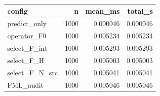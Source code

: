 \begin{tabular}{lrrr}
\toprule
config & n & mean\_ms & total\_s \\
\midrule
predict\_only & 1000 & 0.000046 & 0.000046 \\
operator\_F0 & 1000 & 0.005234 & 0.005234 \\
select\_F\_int & 1000 & 0.005293 & 0.005293 \\
select\_F\_H & 1000 & 0.005003 & 0.005003 \\
select\_F\_N\_src & 1000 & 0.005041 & 0.005041 \\
FML\_audit & 1000 & 0.005046 & 0.005046 \\
\bottomrule
\end{tabular}
